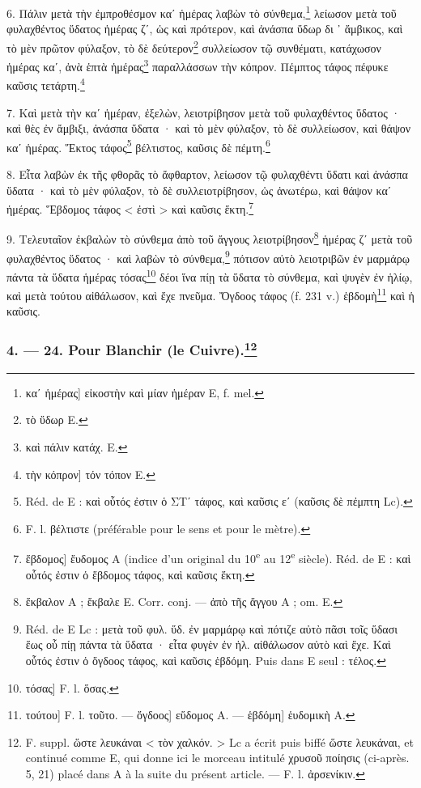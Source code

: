 \documentclass[a4paper, 11pt, oneside, polutonikogreek, french]{article}
\begin{document}
6. Πάλιν μετὰ τὴν ἐμπροθέσμον καʹ ἡμέρας λαβὼν τὸ σύνθεμα,\footnote{καʹ ἡμέρας] εἰκοστὴν καὶ μίαν ἡμέραν E, f. mel.} λείωσον μετὰ τοῦ φυλαχθέντος ὕδατος ἡμέρας ζʹ, ὡς καὶ πρότερον, καὶ ἀνάσπα ὕδωρ δι ᾽ ἄμβικος, καὶ τὸ μὲν πρῶτον φύλαξον, τὸ δὲ δεύτερον\footnote{τὸ ὕδωρ E.} συλλείωσον τῷ συνθέματι, κατάχωσον ἡμέρας καʹ, ἀνὰ ἑπτὰ ἡμέρας\footnote{καὶ πάλιν κατάχ. E.} παραλλάσσων τὴν κόπρον. Πέμπτος τάφος πέφυκε καῦσις τετάρτη.\footnote{τὴν κόπρον] τόν τόπον E.}

7. Καὶ μετὰ τὴν καʹ ἡμέραν, ἐξελὼν, λειοτρίβησον μετὰ τοῦ φυλαχθέντος ὕδατος · καὶ θὲς ἐν ἄμβιξι, ἀνάσπα ὕδατα · καὶ τὸ μὲν φύλαξον, τὸ δὲ συλλείωσον, καὶ θάψον καʹ ἡμέρας. Ἕκτος τάφος\footnote{Réd. de E : καὶ οὗτός ἐστιν ὁ ΣΤʹ τάφος, καὶ καῦσις εʹ (καῦσις δὲ πἐμπτη Lc).} βέλτιστος, καῦσις δὲ πέμτη.\footnote{F. l. βέλτιστε (préférable pour le sens et pour le mètre).}

8. Εἶτα λαβὼν ἐκ τῆς φθορᾶς τὸ ἄφθαρτον, λείωσον τῷ φυλαχθέντι ὕδατι καὶ ἀνάσπα ὕδατα · καὶ τὸ μὲν φύλαξον, τὸ δὲ συλλειοτρίβησον, ὡς ἀνωτέρω, καὶ θάψον καʹ ἡμέρας. Ἕβδομος τάφος < ἐστὶ > καὶ καῦσις ἕκτη.\footnote{ἕβδομος] ἔυδομος A (indice d'un original du 10\textsuperscript{e} au 12\textsuperscript{e} siècle). Réd. de E : καὶ οὗτός ἐστιν ὁ ἕβδομος τάφος, καὶ καῦσις ἕκτη.}

9. Τελευταῖον ἐκβαλὼν τὸ σύνθεμα ἀπὸ τοῦ ἄγγους λειοτρίβησον\footnote{ἔκβαλον A ; ἔκβαλε E. Corr. conj. --- ἀπὸ τῆς ἄγγου A ; om. E.} ἡμέρας ζʹ μετὰ τοῦ φυλαχθέντος ὕδατος · καὶ λαβὼν τὸ σύνθεμα,\footnote{Réd. de E Lc : μετὰ τοῦ φυλ. ὕδ. ἐν μαρμάρῳ καὶ πότιζε αὐτὸ πᾶσι τοῖς ὕδασι ἕως οὗ πίῃ πάντα τὰ ὕδατα · εἶτα φυγὲν ἐν ἡλ. αἰθάλωσον αὐτὸ καὶ ἔχε. Καὶ οὗτός ἐστιν ὁ ὄγδοος τάφος, καὶ καῦσις ἑβδόμη. Puis dans E seul : τέλος.} πότισον αὐτὸ λειοτριβῶν ἐν μαρμάρῳ πάντα τὰ ὕδατα ἡμέρας τόσας\footnote{τόσας] F. l. ὅσας.} δέοι ἵνα πίῃ τὰ ὕδατα τὸ σύνθεμα, καὶ ψυγὲν ἐν ἡλίῳ, καὶ μετὰ τούτου αἰθάλωσον, καὶ ἔχε πνεῦμα. Ὄγδοος τάφος (f. 231 v.) ἑβδομὴ\footnote{τούτου] F. l. τοῦτο. --- ὄγδοος] εὕδομος A. --- ἑβδόμη] ἑυδομικὴ A.} καὶ ἡ καῦσις.

\bigskip
\centerline{\EightStarTaper}
\centerline{\EightStarTaper\EightStarTaper}
\bigskip

\subsubsection[4. --- 24. Pour Blanchir (le Cuivre).]{4. --- 24. Pour Blanchir (le Cuivre).\footnote{F. suppl. ὥστε λευκάναι < τὸν χαλκόν. > Lc a écrit puis biffé ὥστε λευκάναι, et continué comme E, qui donne ici le morceau intitulé χρυσοῦ ποίησις (ci-après. 5, 21) placé dans A à la suite du présent article. --- F. l. ἀρσενίκιν.}}
\end{document}
